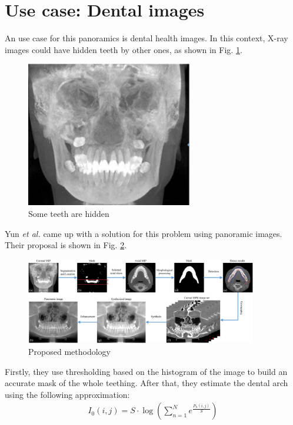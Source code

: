 \section{Use case: Dental images}

An use case for this panoramics is dental health images. In this context, X-ray images could have hidden teeth by other ones, as shown in Fig. \ref{fig:dental_problem}.

\begin{figure}[H]
    \centering
    \includegraphics{img/dental_problem.png}
    \caption{Some teeth are hidden}
    \label{fig:dental_problem}
\end{figure}

Yun \textit{et al.} \cite{yun_automatic_2019} came up with a solution for this problem using panoramic images. Their proposal is shown in Fig. \ref{fig:proposal}.

\begin{figure}[H]
    \centering
    \includegraphics[width=0.9\textwidth]{img/dental_proposal.png}
    \caption{Proposed methodology}
    \label{fig:proposal}
\end{figure}

Firstly, they use thresholding based on the histogram of the image to build an accurate mask of the whole teething. After that, they estimate the dental arch using the following approximation:
\begin{gather*}
    I_0(i, j) = S \cdot \log \left( \sum_{n=1}^N e^{\frac{P_n(i,j)}{S}} \right)
\end{gather*}

